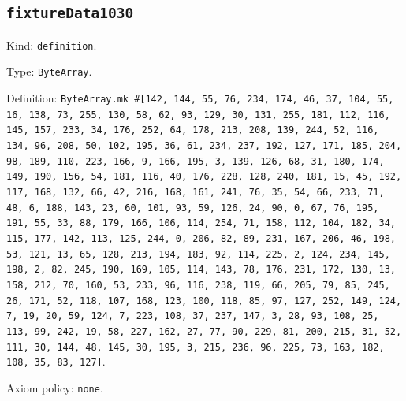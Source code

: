 \documentclass[11pt]{article}
\begin{document}
\subsection*{\texttt{fixtureData1030}}
\noindent Kind: \texttt{definition}.\par
\noindent Type: \texttt{ByteArray}.\par
\noindent Definition: \texttt{ByteArray.mk \#[142, 144, 55, 76, 234, 174, 46, 37, 104, 55, 16, 138, 73, 255, 130, 58, 62, 93, 129, 30, 131, 255, 181, 112, 116, 145, 157, 233, 34, 176, 252, 64, 178, 213, 208, 139, 244, 52, 116, 134, 96, 208, 50, 102, 195, 36, 61, 234, 237, 192, 127, 171, 185, 204, 98, 189, 110, 223, 166, 9, 166, 195, 3, 139, 126, 68, 31, 180, 174, 149, 190, 156, 54, 181, 116, 40, 176, 228, 128, 240, 181, 15, 45, 192, 117, 168, 132, 66, 42, 216, 168, 161, 241, 76, 35, 54, 66, 233, 71, 48, 6, 188, 143, 23, 60, 101, 93, 59, 126, 24, 90, 0, 67, 76, 195, 191, 55, 33, 88, 179, 166, 106, 114, 254, 71, 158, 112, 104, 182, 34, 115, 177, 142, 113, 125, 244, 0, 206, 82, 89, 231, 167, 206, 46, 198, 53, 121, 13, 65, 128, 213, 194, 183, 92, 114, 225, 2, 124, 234, 145, 198, 2, 82, 245, 190, 169, 105, 114, 143, 78, 176, 231, 172, 130, 13, 158, 212, 70, 160, 53, 233, 96, 116, 238, 119, 66, 205, 79, 85, 245, 26, 171, 52, 118, 107, 168, 123, 100, 118, 85, 97, 127, 252, 149, 124, 7, 19, 20, 59, 124, 7, 223, 108, 37, 237, 147, 3, 28, 93, 108, 25, 113, 99, 242, 19, 58, 227, 162, 27, 77, 90, 229, 81, 200, 215, 31, 52, 111, 30, 144, 48, 145, 30, 195, 3, 215, 236, 96, 225, 73, 163, 182, 108, 35, 83, 127]}.\par
\noindent Axiom policy: \texttt{none}.\par
\end{document}
